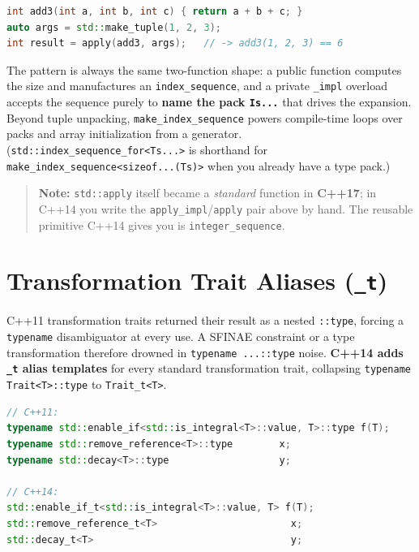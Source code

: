 \begin{lstlisting}[language=C++,caption={Calling it}]
int add3(int a, int b, int c) { return a + b + c; }
auto args = std::make_tuple(1, 2, 3);
int result = apply(add3, args);   // -> add3(1, 2, 3) == 6
\end{lstlisting}

The pattern is always the same two-function shape: a public function computes the size and manufactures an \texttt{index\_sequence}, and a private \texttt{\_impl} overload accepts the sequence purely to \textbf{name the pack \texttt{Is...}} that drives the expansion. Beyond tuple unpacking, \texttt{make\_index\_sequence} powers compile-time loops over packs and array initialization from a generator. (\texttt{std::index\_sequence\_for<Ts...>} is shorthand for \texttt{make\_index\_sequence<sizeof...(Ts)>} when you already have a type pack.)

\begin{quote}
\textbf{Note:} \texttt{std::apply} itself became a \emph{standard} function in \textbf{C++17}; in C++14 you write the \texttt{apply\_impl}/\texttt{apply} pair above by hand. The reusable primitive C++14 gives you is \texttt{integer\_sequence}.
\end{quote}

\section{Transformation Trait Aliases (\texttt{\_t})}
\label{sec:c14-trait-aliases}

C++11 transformation traits returned their result as a nested \texttt{::type}, forcing a \texttt{typename} disambiguator at every use. A SFINAE constraint or a type transformation therefore drowned in \texttt{typename ...::type} noise. \textbf{C++14 adds \texttt{\_t} alias templates} for every standard transformation trait, collapsing \texttt{typename Trait<T>::type} to \texttt{Trait\_t<T>}.

\begin{lstlisting}[language=C++,caption={\_t aliases vs the C++11 spelling}]
// C++11:
typename std::enable_if<std::is_integral<T>::value, T>::type f(T);
typename std::remove_reference<T>::type        x;
typename std::decay<T>::type                   y;

// C++14:
std::enable_if_t<std::is_integral<T>::value, T> f(T);
std::remove_reference_t<T>                       x;
std::decay_t<T>                                  y;
\end{lstlisting}

